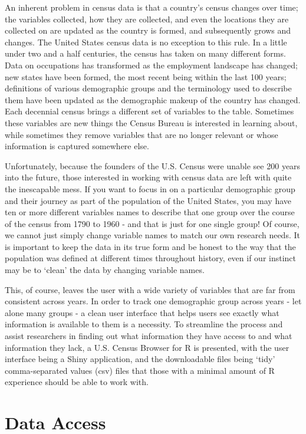 \documentclass[11pt,]{article}
\begin{document}
An inherent problem in census data is that a country's census changes
over time; the variables collected, how they are collected, and even the
locations they are collected on are updated as the country is formed,
and subsequently grows and changes. The United States census data is no
exception to this rule. In a little under two and a half centuries, the
census has taken on many different forms. Data on occupations has
transformed as the employment landscape has changed; new states have
been formed, the most recent being within the last 100 years;
definitions of various demographic groups and the terminology used to
describe them have been updated as the demographic makeup of the country
has changed. Each decennial census brings a different set of variables
to the table. Sometimes these variables are new things the Census Bureau
is interested in learning about, while sometimes they remove variables
that are no longer relevant or whose information is captured somewhere
else.

Unfortunately, because the founders of the U.S. Census were unable see
200 years into the future, those interested in working with census data
are left with quite the inescapable mess. If you want to focus in on a
particular demographic group and their journey as part of the population
of the United States, you may have ten or more different variables names
to describe that one group over the course of the census from 1790 to
1960 - and that is just for one single group! Of course, we cannot just
simply change variable names to match our own research needs. It is
important to keep the data in its true form and be honest to the way
that the population was defined at different times throughout history,
even if our instinct may be to `clean' the data by changing variable
names.

This, of course, leaves the user with a wide variety of variables that
are far from consistent across years. In order to track one demographic
group across years - let alone many groups - a clean user interface that
helps users see exactly what information is available to them is a
necessity. To streamline the process and assist researchers in finding
out what information they have access to and what information they lack,
a U.S. Census Browser for R is presented, with the user interface being
a Shiny application, and the downloadable files being `tidy'
comma-separated values (csv) files that those with a minimal amount of R
experience should be able to work with.

\section{Data Access}
\end{document}
